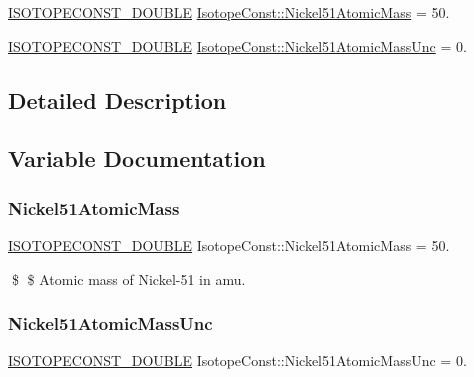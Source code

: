 \begin{DoxyCompactItemize}
\item 
\mbox{\hyperlink{group___isotope_const-_macros_ga8f45a7272ce02c0b4c65c44636ed719a}{I\+S\+O\+T\+O\+P\+E\+C\+O\+N\+S\+T\+\_\+\+D\+O\+U\+B\+LE}} \mbox{\hyperlink{group___isotope_const-_nickel-_ni51_ga4627230f4abfc99f3664a3dd237c6390}{Isotope\+Const\+::\+Nickel51\+Atomic\+Mass}} = 50.
\item 
\mbox{\hyperlink{group___isotope_const-_macros_ga8f45a7272ce02c0b4c65c44636ed719a}{I\+S\+O\+T\+O\+P\+E\+C\+O\+N\+S\+T\+\_\+\+D\+O\+U\+B\+LE}} \mbox{\hyperlink{group___isotope_const-_nickel-_ni51_ga0f5f3ab20cee8786f04e8dbb84b6fc8e}{Isotope\+Const\+::\+Nickel51\+Atomic\+Mass\+Unc}} = 0.
\end{DoxyCompactItemize}


\subsection{Detailed Description}


\subsection{Variable Documentation}
\mbox{\label{group___isotope_const-_nickel-_ni51_ga4627230f4abfc99f3664a3dd237c6390}} 
\subsubsection{\texorpdfstring{Nickel51\+Atomic\+Mass}{Nickel51AtomicMass}}
{\footnotesize\ttfamily \mbox{\hyperlink{group___isotope_const-_macros_ga8f45a7272ce02c0b4c65c44636ed719a}{I\+S\+O\+T\+O\+P\+E\+C\+O\+N\+S\+T\+\_\+\+D\+O\+U\+B\+LE}} Isotope\+Const\+::\+Nickel51\+Atomic\+Mass = 50.}

\$ \$ Atomic mass of Nickel-\/51 in amu. \mbox{\label{group___isotope_const-_nickel-_ni51_ga0f5f3ab20cee8786f04e8dbb84b6fc8e}} 
\subsubsection{\texorpdfstring{Nickel51\+Atomic\+Mass\+Unc}{Nickel51AtomicMassUnc}}
{\footnotesize\ttfamily \mbox{\hyperlink{group___isotope_const-_macros_ga8f45a7272ce02c0b4c65c44636ed719a}{I\+S\+O\+T\+O\+P\+E\+C\+O\+N\+S\+T\+\_\+\+D\+O\+U\+B\+LE}} Isotope\+Const\+::\+Nickel51\+Atomic\+Mass\+Unc = 0.}

